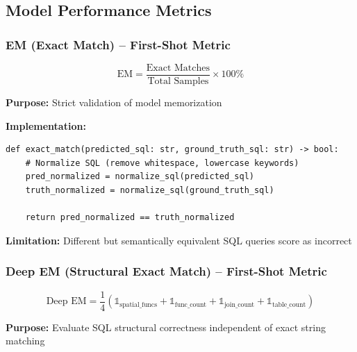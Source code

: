 \subsection{Model Performance Metrics}
\label{subsec:model_performance_metrics}

\subsubsection{EM (Exact Match) -- First-Shot Metric}

\begin{equation}
\text{EM} = \frac{\text{Exact Matches}}{\text{Total Samples}} \times 100\%
\end{equation}

\textbf{Purpose:} Strict validation of model memorization

\textbf{Implementation:}
\begin{lstlisting}[style=pythonstyle]
def exact_match(predicted_sql: str, ground_truth_sql: str) -> bool:
    # Normalize SQL (remove whitespace, lowercase keywords)
    pred_normalized = normalize_sql(predicted_sql)
    truth_normalized = normalize_sql(ground_truth_sql)
    
    return pred_normalized == truth_normalized
\end{lstlisting}

\textbf{Limitation:} Different but semantically equivalent SQL queries score as incorrect



\subsubsection{Deep EM (Structural Exact Match) -- First-Shot Metric}

\begin{equation}
\text{Deep EM} = \frac{1}{4}\left(\mathbb{1}_{\text{spatial\_funcs}} + \mathbb{1}_{\text{func\_count}} + \mathbb{1}_{\text{join\_count}} + \mathbb{1}_{\text{table\_count}}\right)
\end{equation}

\textbf{Purpose:} Evaluate SQL structural correctness independent of exact string matching

